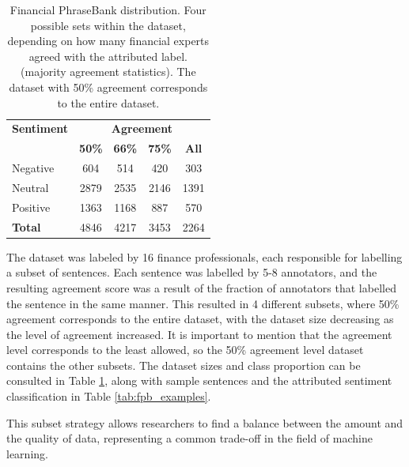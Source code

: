 \documentclass[conference]{IEEEtran}
\begin{document}
\begin{table}[H]
\centering
\caption{Financial PhraseBank distribution. Four possible sets within the dataset, depending on how many financial experts agreed with the attributed label. (majority agreement statistics). The dataset with 50\% agreement corresponds to the entire dataset.}

\label{agreement_datasets}
\begin{tabular}{lcccc}
\toprule
\textbf{Sentiment} & \multicolumn{4}{c}{\textbf{Agreement}} \\
\cmidrule(lr){2-5}
 & \textbf{50\%} & \textbf{66\%} & \textbf{75\%} & \textbf{All} \\
\midrule
Negative & 604 & 514 & 420 & 303 \\
Neutral & 2879 & 2535 & 2146 & 1391 \\
Positive & 1363 & 1168 & 887 & 570 \\
\midrule
\textbf{Total} & 4846 & 4217 & 3453 & 2264 \\
\bottomrule
\end{tabular}
\end{table}

The dataset was labeled by 16 finance professionals, each responsible for labelling a subset of sentences. Each sentence was labelled by 5-8 annotators, and the resulting agreement score was a result of the fraction of annotators that labelled the sentence in the same manner. This resulted in 4 different subsets, where 50\% agreement corresponds to the entire dataset, with the dataset size decreasing as the level of agreement increased. It is important to mention that the agreement level corresponds to the least allowed, so the 50\% agreement level dataset contains the other subsets. The dataset sizes and class proportion can be consulted in Table \ref{agreement_datasets}, along with sample sentences and the attributed sentiment classification in Table \ref{tab:fpb_examples}.

This subset strategy allows researchers to find a balance between the amount and the quality of data, representing a common trade-off in the field of machine learning.

\end{document}

